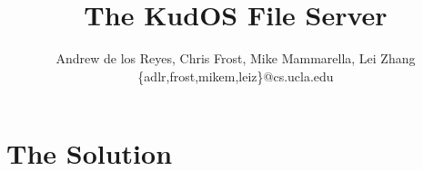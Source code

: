 \documentclass[11pt]{article}
\title{The KudOS File Server}
\author{Andrew de los Reyes, Chris Frost, Mike Mammarella, Lei Zhang\\ \{adlr,frost,mikem,leiz\}@cs.ucla.edu}
\begin{document}
\maketitle





\section{The Solution}
\label{sec:solution}











\end{document}
